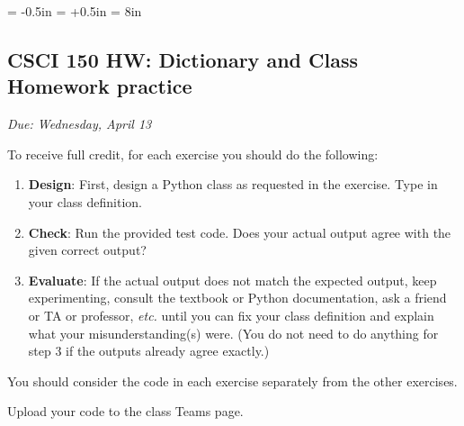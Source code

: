 \documentclass[]{article}
\date{}
\begin{document}
\oddsidemargin =-0.5in
\evensidemargin = -0.5in
\rightmargin = +0.5in
\textwidth = 8in

\hypertarget{csci-150-hw-class-design-practice}{%
\subsection{CSCI 150 HW: Dictionary and Class Homework
practice}\label{csci-150-hw-class-design-practice}}

\emph{Due: Wednesday,  April 13}

To receive full credit, for each exercise you should do the following:

\begin{enumerate}
\def\labelenumi{\arabic{enumi}.}
\item
  \textbf{Design}: First, design a Python class as requested in the
  exercise. Type in your class definition.
\item
  \textbf{Check}: Run the provided test code. Does your actual output
  agree with the given correct output?
\item
  \textbf{Evaluate}: If the actual output does not match the expected
  output, keep experimenting, consult the textbook or Python
  documentation, ask a friend or TA or professor, \emph{etc.} until you
  can fix your class definition and explain what your
  misunderstanding(s) were. (You do not need to do anything for step 3
  if the outputs already agree exactly.)
\end{enumerate}

You should consider the code in each exercise separately from the other
exercises.

\vspace{0.2in}

Upload your code to the class Teams page.
\end{document}
